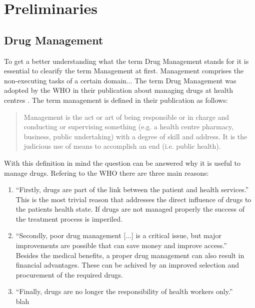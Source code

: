 \chapter{Preliminaries}
\label{cha:prelims}

\section{Drug Management}
\label{sec:drug-management}

To get a better understanding what the term Drug Management stands for it is essential to clearify the term Management at first.
Management comprises the non-executing tasks of a certain domain... \todo{}
The term Drug Management was adopted by the WHO in their publication about managing drugs at health centres \cite{who2004}.
The term management is defined in their publication as follows: 
\begin{quote}
  Management is the act or art of being responsible or in charge and conducting or supervising something (e.g. a health centre pharmacy, business, public undertaking) with a degree of skill and address. It is the judicious use of means to accomplish an end (i.e. public health).
\end{quote}
With this definition in mind the question can be answered why it is useful to manage drugs.
Refering to the WHO there are three main reasons:
\begin{enumerate}
\item ``Firstly, drugs are part of the link between the patient and health services.''\\
  This is the most trivial reason that addresses the direct influence of drugs to the patients health state. If drugs are not managed properly the success of the treatment process is imperiled. 
\item ``Secondly, poor drug management [...] is a critical issue, but major improvements are possible that can save money and improve access.''\\
  Besides the medical benefits, a proper drug management can also result in financial advantages. These can be achived by an improved selection and procurement of the required drugs.
\item ``Finally, drugs are no longer the responsibility of health workers only.''\\
  blah \todo{}
\end{enumerate}

